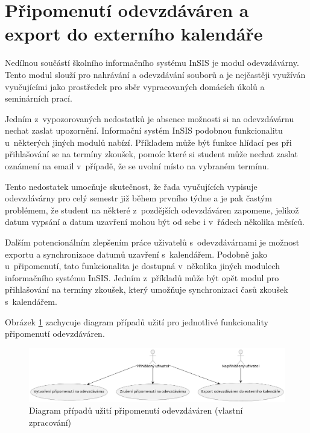 \section{Připomenutí odevzdáváren a export do externího kalendáře}\label{sec:pripomenuti-odevzdavaren}

Nedílnou součástí školního informačního systému InSIS je modul odevzdávárny. Tento modul slouží pro nahrávání a odevzdávání souborů a je nejčastěji využíván vyučujícími jako prostředek pro sběr vypracovaných domácích úkolů a seminárních prací. 

Jedním z~vypozorovaných nedostatků je absence možnosti si na odevzdávárnu nechat zaslat upozornění. Informační systém InSIS podobnou funkcionalitu u~některých jiných modulů nabízí. Příkladem může být funkce hlídací pes při přihlašování se na termíny zkoušek, pomoíc které si student může nechat zaslat oznámení na email v~případě, že se uvolní místo na vybraném termínu.

Tento nedostatek umocňuje skutečnost, že řada vyučujících vypisuje odevzdávárny pro celý semestr již během prvního týdne a je pak častým problémem, že student na některé z~pozdějších odevzdáváren zapomene, jelikož datum vypsání a datum uzavření mohou být od sebe i v~řádech několika měsíců.

Dalším potencionálním zlepšením práce uživatelů s~odevzdávárnami je možnost exportu a synchronizace datumů uzavření s~kalendářem. Podobně jako u~připomenutí, tato funkcionalita je dostupná v~několika jiných modulech informačního systému InSIS. Jedním z~příkladů může být opět modul pro přihlašování na termíny zkoušek, který umožňuje synchronizaci časů zkoušek s~kalendářem.

Obrázek \ref{fig:usecase-odevzdavarny} zachycuje diagram případů užití pro jednotlivé funkcionality připomenutí odevzdáváren.

\begin{figure}[htbp!]\centering
    \includegraphics[width=\textwidth]{img/uc-odevzdavarny.png}
    \caption{Diagram případů užití připomenutí odevzdáváren (vlastní zpracování)}
    \label{fig:usecase-odevzdavarny}
\end{figure}

